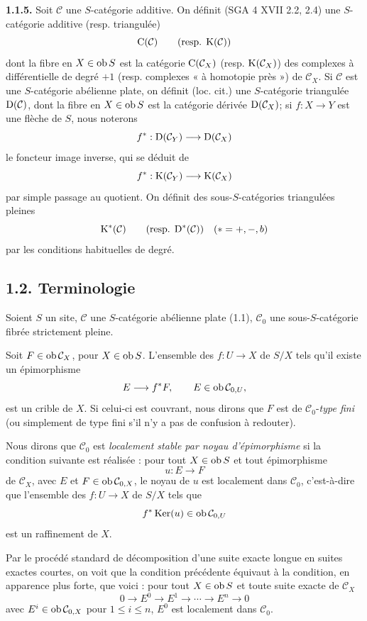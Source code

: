 \documentclass[11pt]{article}
\providecommand{\Ker}{\operatorname{Ker}}
\begin{document}
\textbf{1.1.5.} Soit \(\mathcal C\) une \(S\)-catégorie additive. On définit (SGA 4 XVII 2.2, 2.4) une \(S\)-catégorie additive (resp. triangulée)
\[
  \mathrm C(\mathcal C)\qquad\text{(resp. }\mathrm K(\mathcal C)\text{)}
\]
dont la fibre en \(X\in\operatorname{ob} S\) est la catégorie \(\mathrm C(\mathcal C_X)\) (resp. \(\mathrm K(\mathcal C_X)\)) des complexes à différentielle de degré \(+1\) (resp. complexes « à homotopie près ») de \(\mathcal C_X\). Si \(\mathcal C\) est une \(S\)-catégorie abélienne plate, on définit (loc. cit.) une \(S\)-catégorie triangulée \(\mathrm D(\mathcal C)\), dont la fibre en \(X\in\operatorname{ob} S\) est la catégorie dérivée \(\mathrm D(\mathcal C_X)\); si \(f:X\to Y\) est une flèche de \(S\), nous noterons
\[
  f^*:\mathrm D(\mathcal C_Y)\longrightarrow \mathrm D(\mathcal C_X)
\]
le foncteur image inverse, qui se déduit de
\[
  f^*:\mathrm K(\mathcal C_Y)\longrightarrow \mathrm K(\mathcal C_X)
\]
par simple passage au quotient. On définit des sous-\(S\)-catégories triangulées pleines
\[
  \mathrm K^*(\mathcal C)\qquad\text{(resp. }\mathrm D^*(\mathcal C)\text{)}
  \quad (*=+,-,b)
\]
par les conditions habituelles de degré.

\subsection*{1.2. Terminologie}

Soient \(S\) un site, \(\mathcal C\) une \(S\)-catégorie abélienne plate (1.1), \(\mathcal C_0\) une sous-\(S\)-catégorie fibrée strictement pleine.

Soit \(F\in\operatorname{ob}\mathcal C_X\), pour \(X\in\operatorname{ob} S\). L'ensemble des \(f:U\to X\) de \(S/X\) tels qu'il existe un épimorphisme
\[
  E\longrightarrow f^*F,\qquad E\in\operatorname{ob}\mathcal C_{0,U},
\]
est un crible de \(X\). Si celui-ci est couvrant, nous dirons que \(F\) est de \(\mathcal C_0\)-\emph{type fini} (ou simplement de type fini s'il n'y a pas de confusion à redouter).

Nous dirons que \(\mathcal C_0\) est \emph{localement stable par noyau d'épimorphisme} si la condition suivante est réalisée : pour tout \(X\in\operatorname{ob} S\) et tout épimorphisme
\[
  u:E\longrightarrow F
\]
de \(\mathcal C_X\), avec \(E\) et \(F\in\operatorname{ob}\mathcal C_{0,X}\), le noyau de \(u\) est localement dans \(\mathcal C_0\), c'est-à-dire que l'ensemble des \(f:U\to X\) de \(S/X\) tels que
\[
  f^*\Ker(u)\in\Ob\mathcal C_{0,U}
\]
est un raffinement de \(X\).

Par le procédé standard de décomposition d'une suite exacte longue en suites exactes courtes, on voit que la condition précédente équivaut à la condition, en apparence plus forte, que voici : pour tout \(X\in\operatorname{ob} S\) et toute suite exacte de \(\mathcal C_X\)
\begin{equation}\tag{*}
  0\longrightarrow E^0\longrightarrow E^1\longrightarrow\cdots\longrightarrow E^n\longrightarrow 0
\end{equation}
avec \(E^i\in\operatorname{ob}\mathcal C_{0,X}\) pour \(1\leq i\leq n\), \(E^0\) est localement dans \(\mathcal C_0\).
\end{document}

